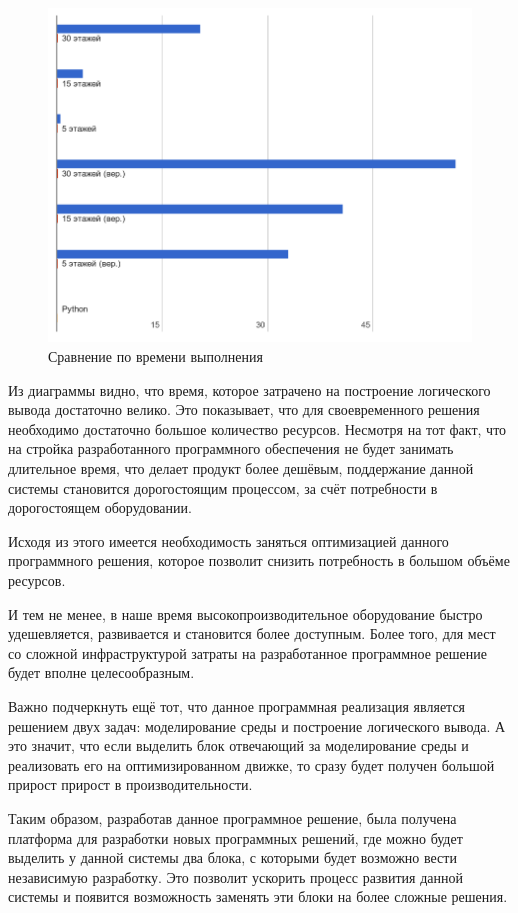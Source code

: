 	\begin{figure}[h]
		\centering
		\includegraphics[width=180mm]{src/pictures/projectp2.png}
		\caption{Сравнение по времени выполнения}\label{pt2}
	\end{figure}

	Из диаграммы видно, что время, которое затрачено на построение логического вывода достаточно велико.
		Это показывает, что для своевременного решения необходимо достаточно большое количество ресурсов.
		Несмотря на тот факт, что на стройка разработанного программного обеспечения не будет занимать
		длительное время, что делает продукт более дешёвым, поддержание данной системы становится
		дорогостоящим процессом, за счёт потребности в дорогостоящем оборудовании.

	Исходя из этого имеется необходимость заняться оптимизацией данного программного решения,
		которое позволит снизить потребность в большом объёме ресурсов.

	И тем не менее, в наше время высокопроизводительное оборудование быстро удешевляется, развивается и
		становится более доступным. Более того, для мест со сложной инфраструктурой затраты на
		разработанное программное решение будет вполне целесообразным.

	Важно подчеркнуть ещё тот, что данное программная реализация является решением двух задач: моделирование 
		среды и построение логического вывода. А это значит, что если выделить блок отвечающий
		за моделирование среды и реализовать его на оптимизированном движке, то сразу будет
		получен большой прирост прирост в производительности.

	Таким образом, разработав данное программное решение, была получена платформа для разработки
		новых программных решений, где можно будет выделить у данной системы два блока, с которыми
		будет возможно вести независимую разработку. Это позволит ускорить процесс развития данной системы
		и появится возможность заменять эти блоки на более сложные решения.
